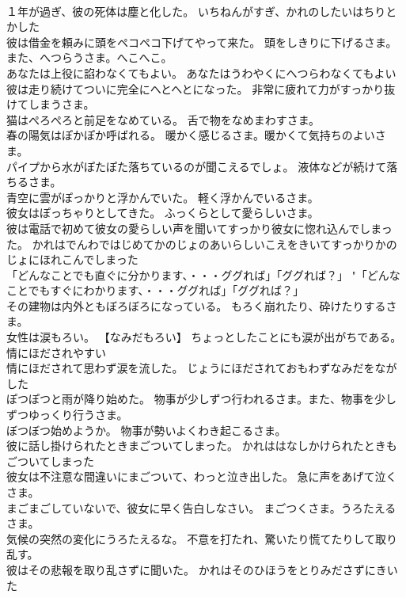 \documentclass[8pt]{extreport}
\begin{document}
\begin{CJK}{UTF8}{min}
\\	１年が過ぎ、彼の死体は塵と化した。	いちねんがすぎ、かれのしたいはちりとかした 
\\	彼は借金を頼みに頭をペコペコ下げてやって来た。	頭をしきりに下げるさま。また、へつらうさま。へこへこ。
\\	あなたは上役に諂わなくてもよい。	あなたはうわやくにへつらわなくてもよい 
\\	彼は走り続けてついに完全にへとへとになった。	非常に疲れて力がすっかり抜けてしまうさま。
\\	猫はぺろぺろと前足をなめている。	舌で物をなめまわすさま。
\\	春の陽気はぽかぽか呼ばれる。	暖かく感じるさま。暖かくて気持ちのよいさま。
\\	パイプから水がぽたぽた落ちているのが聞こえるでしょ。	液体などが続けて落ちるさま。
\\	青空に雲がぽっかりと浮かんでいた。	軽く浮かんでいるさま。
\\	彼女はぽっちゃりとしてきた。	ふっくらとして愛らしいさま。
\\	彼は電話で初めて彼女の愛らしい声を聞いてすっかり彼女に惚れ込んでしまった。	かれはでんわではじめてかのじょのあいらしいこえをきいてすっかりかのじょにほれこんでしまった 
\\	「どんなことでも直ぐに分かります、・・・ググれば」「ググれば？」	"「どんなことでもすぐにわかります、・・・ググれば」「ググれば？」 
\\	その建物は内外ともぼろぼろになっている。	もろく崩れたり、砕けたりするさま。
\\	女性は涙もろい。	【なみだもろい】 ちょっとしたことにも涙が出がちである。情にほだされやすい
\\	情にほだされて思わず涙を流した。	じょうにほだされておもわずなみだをながした 
\\	ぽつぽつと雨が降り始めた。	物事が少しずつ行われるさま。また、物事を少しずつゆっくり行うさま。
\\	ぼつぼつ始めようか。	物事が勢いよくわき起こるさま。
\\	彼に話し掛けられたときまごついてしまった。	かれははなしかけられたときもごついてしまった 
\\	彼女は不注意な間違いにまごついて、わっと泣き出した。	急に声をあげて泣くさま。
\\	まごまごしていないで、彼女に早く告白しなさい。	まごつくさま。うろたえるさま。
\\	気候の突然の変化にうろたえるな。	不意を打たれ、驚いたり慌てたりして取り乱す。
\\	彼はその悲報を取り乱さずに聞いた。	かれはそのひほうをとりみださずにきいた 

\end{CJK}
\end{document}
